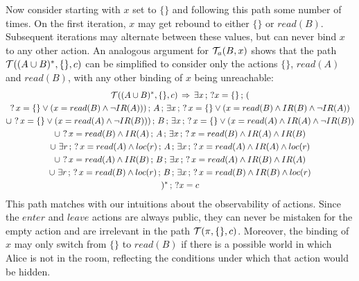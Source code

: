  Now consider starting with $x$ set to $\{\}$ and following this
path some number of times. On the first iteration, $x$ may get rebound
to either $\{\}$ or $read(B)$. Subsequent iterations may alternate
between these values, but can never bind $x$ to any other action.
An analogous argument for $\mathcal{T}_{a}(B,x)$ shows that the path $\mathcal{T}((A\cup B)^{*},\{\},c)$
can be simplified to consider only the actions $\{\}$, $read(A)$
and $read(B)$, with any other binding of $x$ being unreachable:\begin{multline*}
\mathcal{T}((A\cup B)^{*},\{\},c)\,\Rightarrow\,\exists x\,;\,?x=\{\}\,;\,(\\
?\, x=\{\}\vee(x=read(B)\wedge\neg IR(A)))\,;\, A\,;\,\exists x\,;\,?\, x=\{\}\vee(x=read(B)\wedge IR(B)\wedge\neg IR(A))\\
\cup\,\,?\, x=\{\}\vee(x=read(A)\wedge\neg IR(B)))\,;\, B\,;\,\exists x\,;\,?\, x=\{\}\vee(x=read(A)\wedge IR(A)\wedge\neg IR(B))\\
\cup\,\,?\, x=read(B)\wedge IR(A)\,;\, A\,;\,\exists x\,;\,?\, x=read(B)\wedge IR(A)\wedge IR(B)\\
\cup\,\,\exists r\,;\,?\, x=read(A)\wedge loc(r)\,;\, A\,;\,\exists x\,;\,?\, x=read(A)\wedge IR(A)\wedge loc(r)\\
\cup\,\,?\, x=read(A)\wedge IR(B)\,;\, B\,;\,\exists x\,;\,?\, x=read(A)\wedge IR(B)\wedge IR(A)\\
\cup\,\,\exists r\,;\,?\, x=read(B)\wedge loc(r)\,;\, B\,;\,\exists x\,;\,?\, x=read(B)\wedge IR(B)\wedge loc(r)\\
)^{*}\,;\,?x=c\end{multline*}
 This path matches with our intuitions about the observability of
actions. Since the $enter$ and $leave$ actions are always public,
they can never be mistaken for the empty action and are irrelevant
in the path $\mathcal{T}(\pi,\{\},c)$. Moreover, the binding of $x$ may
only switch from $\{\}$ to $read(B)$ if there is a possible world
in which Alice is not in the room, reflecting the conditions under which
that action would be hidden.

